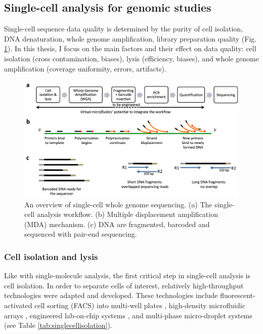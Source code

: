 \subsection{Single-cell analysis for genomic studies}
Single-cell sequence data quality is determined by the purity of cell isolation, DNA denaturation, whole genome amplification, library preparation quality (Fig. \ref{fig:Intro}). In this thesis, I focus on the main factors and their effect on data quality: cell isolation (cross contamination, biases), lysis (efficiency, biases), and whole genome amplification (coverage uniformity, errors, artifacts).

\begin{figure}[ht!]
\centering
\includegraphics[keepaspectratio,width=\textwidth]{./figures/Introduction_Sequencing}
\caption[An overview of single-cell whole genome sequencing]{An overview of single-cell whole genome sequencing. (a) The single-cell analysis workflow. (b) Multiple displacement amplification (MDA) mechanism. (c) DNA are fragmented, barcoded and sequenced with pair-end sequencing.}
\label{fig:Intro}
\end{figure}

\subsubsection{Cell isolation and lysis} 
Like with single-molecule analysis, the first critical step in single-cell analysis is cell isolation. In order to separate cells of interest, relatively high-throughput technologies were adapted and developed. These technologies include fluorescent-activated cell sorting (FACS) into multi-well plates \cite{Zhang:2006hq}, high-density microfluidic arrays \cite{Love:2013hf}, engineered lab-on-chip systems \cite{Thorsen:2002dn,Landry:2013dh,deBourcy:2014ji, Marcy:2007ip}, and multi-phase micro-droplet systems \cite{Fu:2015gl,Thorsen:2001td,Morinishi:2015jx,Mazutis:2013wn,Hindson:2013hb} (see Table \ref{tab:singlecellisolation}). %


